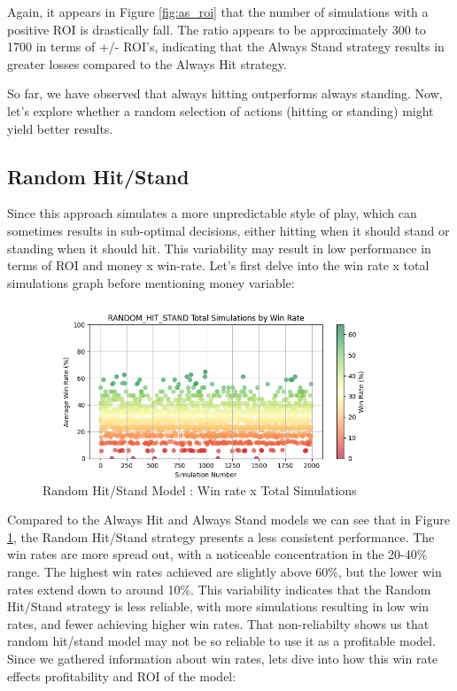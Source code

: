 \documentclass[a4paper,12pt]{report}
\begin{document}
Again, it appears in Figure \ref{fig:as_roi} that the number of simulations with a positive ROI is drastically fall. The ratio appears to be approximately 300 to 1700 in terms of +/- ROI's, indicating that the Always Stand strategy results in greater losses compared to the Always Hit strategy.

So far, we have observed that always hitting outperforms always standing. Now, let's explore whether a random selection of actions (hitting or standing) might yield better results.

\subsection{Random Hit/Stand}
Since this approach simulates a more unpredictable style of play, which can sometimes  results in sub-optimal decisions, either hitting when it should stand or standing when it should hit. This variability may result in low performance in terms of ROI and money x win-rate. Let's first delve into the win rate x total simulations graph before mentioning money variable:

\begin{figure}[h]
\begin{center}
\includegraphics[scale=0.6]{figures/graphs/rhs_wr_ts.png}
\end{center}
\caption{Random Hit/Stand Model : Win rate x Total Simulations}
\label{fig:rhs_money_wr}
\end{figure}

Compared to the Always Hit and Always Stand models we can see that in Figure \ref{fig:rhs_money_wr}, the Random Hit/Stand strategy presents a less consistent performance. The win rates are more spread out, with a noticeable concentration in the 20-40\% range. The highest win rates achieved are slightly above 60\%, but the lower win rates extend down to around 10\%. This variability indicates that the Random Hit/Stand strategy is less reliable, with more simulations resulting in low win rates, and fewer achieving higher win rates. That non-reliabilty shows us that random hit/stand model may not be so reliable to use it as a profitable model. Since we gathered information about win rates, lets dive into how this win rate effects profitability and ROI of the model:
\end{document}
